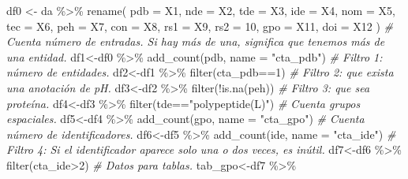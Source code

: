 \documentclass[
]{book}
\newenvironment{Shaded}{\begin{snugshade}}{\end{snugshade}}
\newcommand{\AttributeTok}[1]{\textcolor[rgb]{0.77,0.63,0.00}{#1}}
\newcommand{\CommentTok}[1]{\textcolor[rgb]{0.56,0.35,0.01}{\textit{#1}}}
\newcommand{\DecValTok}[1]{\textcolor[rgb]{0.00,0.00,0.81}{#1}}
\newcommand{\FunctionTok}[1]{\textcolor[rgb]{0.00,0.00,0.00}{#1}}
\newcommand{\NormalTok}[1]{#1}
\newcommand{\OtherTok}[1]{\textcolor[rgb]{0.56,0.35,0.01}{#1}}
\newcommand{\SpecialCharTok}[1]{\textcolor[rgb]{0.00,0.00,0.00}{#1}}
\newcommand{\StringTok}[1]{\textcolor[rgb]{0.31,0.60,0.02}{#1}}
\theoremstyle{definition}
\theoremstyle{definition}
\theoremstyle{definition}
\theoremstyle{definition}
\theoremstyle{remark}
\begin{document}
\begin{Shaded}
\begin{Highlighting}[]
\NormalTok{df0 }\OtherTok{\textless{}{-}}\NormalTok{ da }\SpecialCharTok{\%\textgreater{}\%}
  \FunctionTok{rename}\NormalTok{(}
    \AttributeTok{pdb =}\NormalTok{ X1,}
    \AttributeTok{nde =}\NormalTok{ X2,}
    \AttributeTok{tde =}\NormalTok{ X3,}
    \AttributeTok{ide =}\NormalTok{ X4,}
    \AttributeTok{nom =}\NormalTok{ X5,}
    \AttributeTok{tec =}\NormalTok{ X6,}
    \AttributeTok{peh =}\NormalTok{ X7,}
    \AttributeTok{con =}\NormalTok{ X8,}
    \AttributeTok{rs1 =}\NormalTok{ X9,}
    \AttributeTok{rs2 =} \DecValTok{10}\NormalTok{,}
    \AttributeTok{gpo =}\NormalTok{ X11,}
    \AttributeTok{doi =}\NormalTok{ X12}
\NormalTok{  )}
\CommentTok{\# Cuenta número de entradas. Si hay más de una, significa que tenemos más de una entidad.}
\NormalTok{df1}\OtherTok{\textless{}{-}}\NormalTok{df0 }\SpecialCharTok{\%\textgreater{}\%}
  \FunctionTok{add\_count}\NormalTok{(pdb, }\AttributeTok{name =} \StringTok{"cta\_pdb"}\NormalTok{)}
\CommentTok{\# Filtro 1: número de entidades.}
\NormalTok{df2}\OtherTok{\textless{}{-}}\NormalTok{df1 }\SpecialCharTok{\%\textgreater{}\%} 
  \FunctionTok{filter}\NormalTok{(cta\_pdb}\SpecialCharTok{==}\DecValTok{1}\NormalTok{)}
\CommentTok{\# Filtro 2: que exista una anotación de pH.}
\NormalTok{df3}\OtherTok{\textless{}{-}}\NormalTok{df2 }\SpecialCharTok{\%\textgreater{}\%} 
  \FunctionTok{filter}\NormalTok{(}\SpecialCharTok{!}\FunctionTok{is.na}\NormalTok{(peh))}
\CommentTok{\# Filtro 3: que sea proteína.}
\NormalTok{df4}\OtherTok{\textless{}{-}}\NormalTok{df3 }\SpecialCharTok{\%\textgreater{}\%} 
  \FunctionTok{filter}\NormalTok{(tde}\SpecialCharTok{==}\StringTok{"polypeptide(L)"}\NormalTok{)}
\CommentTok{\# Cuenta grupos espaciales.}
\NormalTok{df5}\OtherTok{\textless{}{-}}\NormalTok{df4 }\SpecialCharTok{\%\textgreater{}\%}
  \FunctionTok{add\_count}\NormalTok{(gpo, }\AttributeTok{name =} \StringTok{"cta\_gpo"}\NormalTok{)}
\CommentTok{\# Cuenta número de identificadores. }
\NormalTok{df6}\OtherTok{\textless{}{-}}\NormalTok{df5 }\SpecialCharTok{\%\textgreater{}\%}
  \FunctionTok{add\_count}\NormalTok{(ide, }\AttributeTok{name =} \StringTok{"cta\_ide"}\NormalTok{)}
\CommentTok{\# Filtro 4: Si el identificador aparece solo una o dos veces, es inútil.}
\NormalTok{df7}\OtherTok{\textless{}{-}}\NormalTok{df6 }\SpecialCharTok{\%\textgreater{}\%} 
  \FunctionTok{filter}\NormalTok{(cta\_ide}\SpecialCharTok{\textgreater{}}\DecValTok{2}\NormalTok{)}
\CommentTok{\# Datos para tablas.}
\NormalTok{tab\_gpo}\OtherTok{\textless{}{-}}\NormalTok{df7 }\SpecialCharTok{\%\textgreater{}\%}

\end{Highlighting}
\end{Shaded}
\end{document}
